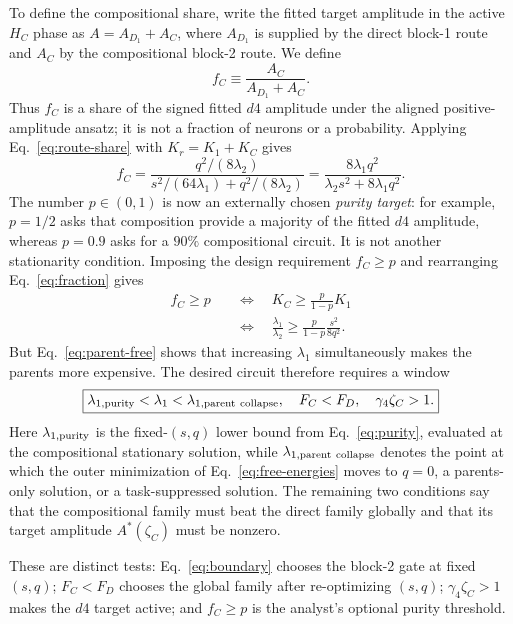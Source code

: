 \documentclass[10pt]{article}
\begin{document}
To define the compositional share, write the fitted target amplitude in the active $H_C$ phase
as $A=A_{D_1}+A_C$, where $A_{D_1}$ is supplied by the direct block-1 route and $A_C$ by the
compositional block-2 route.  We define
\begin{equation}
f_C\equiv\frac{A_C}{A_{D_1}+A_C}.
\label{eq:fc-definition}
\end{equation}
Thus $f_C$ is a share of the signed fitted $d4$ amplitude under the aligned positive-amplitude
ansatz; it is not a fraction of neurons or a probability.  Applying
Eq.~\eqref{eq:route-share} with $K_r=K_1+K_C$ gives
\begin{equation}
\boxed{f_C=\frac{q^2/(8\lambda_2)}{s^2/(64\lambda_1)+q^2/(8\lambda_2)}
=\frac{8\lambda_1q^2}{\lambda_2s^2+8\lambda_1q^2}.}
\label{eq:fraction}
\end{equation}
The number $p\in(0,1)$ is now an externally chosen \emph{purity target}: for example,
$p=1/2$ asks that composition provide a majority of the fitted $d4$ amplitude, whereas
$p=0.9$ asks for a $90\%$ compositional circuit.  It is not another stationarity condition.
Imposing the design requirement $f_C\geq p$ and rearranging Eq.~\eqref{eq:fraction} gives
\begin{align}
f_C\geq p
&\quad\Longleftrightarrow\quad
K_C\geq\frac{p}{1-p}K_1\nonumber\\[-2pt]
&\quad\Longleftrightarrow\quad
\frac{\lambda_1}{\lambda_2}\geq
\frac{p}{1-p}\frac{s^2}{8q^2}.
\label{eq:purity}
\end{align}
But Eq.~\eqref{eq:parent-free} shows that increasing $\lambda_1$ simultaneously makes the
parents more expensive.  The desired circuit therefore requires a window
\begin{equation}
\boxed{\lambda_{1,\rm purity}<\lambda_1<\lambda_{1,\rm parent\ collapse},\quad
F_C<F_D,\quad \gamma_4\zeta_C>1.}
\label{eq:window}
\end{equation}
Here $\lambda_{1,\rm purity}$ is the fixed-$(s,q)$ lower bound from
Eq.~\eqref{eq:purity}, evaluated at the compositional stationary solution, while
$\lambda_{1,\rm parent\ collapse}$ denotes the point at which the outer minimization of
Eq.~\eqref{eq:free-energies} moves to $q=0$, a parents-only solution, or a task-suppressed
solution.  The remaining two conditions say that the compositional family must beat the
direct family globally and that its target amplitude $A^*(\zeta_C)$ must be nonzero.

These are distinct tests: Eq.~\eqref{eq:boundary} chooses the block-2 gate at fixed $(s,q)$;
$F_C<F_D$ chooses the global family after re-optimizing $(s,q)$;
$\gamma_4\zeta_C>1$ makes the $d4$ target active; and $f_C\geq p$ is the analyst's optional
purity threshold.
\end{document}
